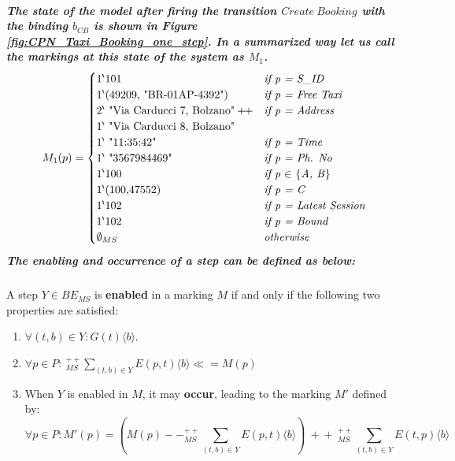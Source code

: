 \subparagraph*{\textnormal{The state of the model after firing the transition $\mathit{Create\ Booking}$ with the binding $\mathit{b_{CB}}$ is shown in Figure \ref{fig:CPN_Taxi_Booking_one_step}. In a summarized way let us call the markings at this state of the system as $\mathit{M_{1}}$.
\begin{equation*}
M_{1}(p) = \begin{cases}
\textnormal{${1}^{\backprime}$101} & \textit{if p = S\_ID}\\
\textnormal{${1}^{\backprime}$(49209,\bdsq{BR-01AP-4392})}  & \textit{if p = Free Taxi}\\
\textnormal{${2}^{\backprime}$\bdsq{Via Carducci 7, Bolzano}} +\!\!+ & \textit{if p = Address}\\ 
\textnormal{${1}^{\backprime}$\bdsq{Via Carducci 8, Bolzano}} & \\
\textnormal{${1}^{\backprime}$\bdsq{11:35:42}} & \textit{if p = Time}\\
\textnormal{${1}^{\backprime}$\bdsq{3567984469}} & \textit{if p = Ph. No}\\
\textnormal{${1}^{\backprime}$100} & \textit{if p $\in$ \textnormal{\{}A, B\textnormal{\}}}\\
\textnormal{${1}^{\backprime}$(100,47552)} & \textit{if p = C}\\
\textnormal{${1}^{\backprime}$102} & \textit{if p = Latest Session}\\
\textnormal{${1}^{\backprime}$102} & \textit{if p = Bound}\\
\emptyset_{MS} & \textit{otherwise}
\end{cases}
\end{equation*}
The enabling and occurrence of a step can be defined as below:}}
\begin{defs}
	\label{defs:enabling_steps_cpn}
	A step $\mathit{Y \in BE_{MS}}$ is \textbf{enabled} in a marking $\mathit{M}$ if and only if the following
	two properties are satisfied:
	\begin{enumerate}
		\item $\mathit{\forall (t,b) \in Y : G(t)\langle b \rangle}$.
		\item $\mathit{\forall p \in P :\ ^{++}_{MS} \sum\limits_{(t,b) \in Y} E(p,t)\langle b \rangle \ll= M(p)}$
		\item When $\mathit{Y}$ is enabled in $\mathit{M}$, it may \textbf{occur}, leading to the marking $\mathit{M'}$ defined by:
		\begin{equation*}
			\forall p \in P : M'(p) = \left(M(p) -\!- ^{++}_{MS} \sum\limits_{(t,b) \in Y} E(p,t)\langle b \rangle \right)\ +\!\!+\ ^{++}_{MS}\sum\limits_{(t,b) \in Y} E(t,p)\langle b \rangle
		\end{equation*}
	\end{enumerate}
\end{defs}

